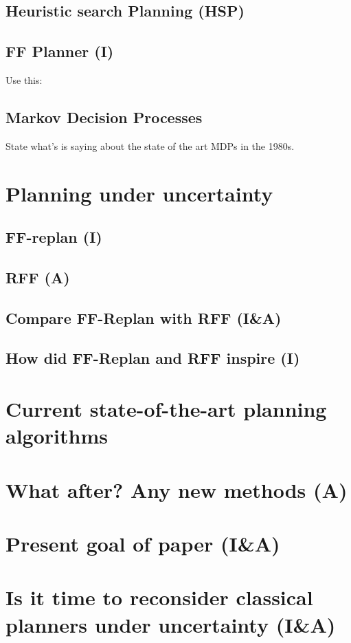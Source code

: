 \documentclass[runningheads,a4paper]{llncs}
\begin{document}
\subsection{Heuristic search Planning (HSP)}

\subsection{FF Planner (I)}
Use this: \cite{Hoffmann01theff}

\subsection{Markov Decision Processes}

State what's \cite{monahan1982state} is saying about the state of the art MDPs
in the 1980s.

\section{Planning under uncertainty}

\subsection{FF-replan (I)}

\subsection{RFF (A)}

\subsection{Compare FF-Replan with RFF (I\&A)}

\subsection{How did FF-Replan and RFF inspire (I)}

\section{Current state-of-the-art planning algorithms}

\section{What after? Any new methods (A)}

\section{Present goal of paper (I\&A)}

\section{Is it time to reconsider classical planners under uncertainty (I\&A)}



\end{document}
